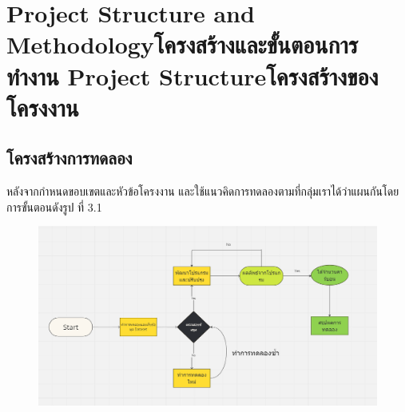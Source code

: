 \chapter{\ifproject%
\ifenglish Project Structure and Methodology\else โครงสร้างและขั้นตอนการทำงาน\fi
\else%
\ifenglish Project Structure\else โครงสร้างของโครงงาน\fi
\fi
}


\makeatletter


\makeatother

\section{โครงสร้างการทดลอง}

หลังจากกำหนดขอบเขตและหัวข้อโครงงาน และใช้แนวคิดการทดลองตามที่กลุ่มเราได้ว่าแผนกันโดยการขั้นตอนดังรูป ที่ 3.1

\begin{figure}[h!]
  \begin{center}
    \includegraphics[width=\textwidth]{3_1.png}
  \end{center}
  \caption[Poem]{}
\end{figure}

